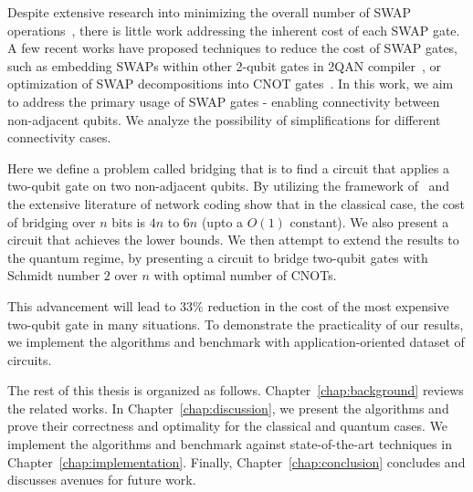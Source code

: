 Despite extensive research into minimizing the overall number of SWAP operations~\cite{childs, TODO}, there is little work addressing the inherent cost of each SWAP gate. A few recent works have proposed techniques to reduce the cost of SWAP gates, such as embedding SWAPs within other 2-qubit gates in 2QAN compiler~\cite{lao2021}, or optimization of SWAP decompositions into CNOT gates~\cite{kissinger2019,nash2020}. In this work, we aim to address the primary usage of SWAP gates - enabling connectivity between non-adjacent qubits. We analyze the possibility of simplifications for different connectivity cases.

Here we define a problem called bridging that is to find a circuit that applies a two-qubit gate on two non-adjacent qubits. By utilizing the framework of~\cite{kissinger2019} and the extensive literature of network coding \cite{TODO} show that in the classical case, the cost of bridging over $n$ bits is $4n$ to $6n$ (upto a $O(1)$ constant). We also present a circuit that achieves the lower bounds. We then attempt to extend the results to the quantum regime, by presenting a circuit to bridge two-qubit gates with Schmidt number $2$ over $n$ with optimal number of CNOTs.

This advancement will lead to $33\%$ reduction in the cost of the most expensive two-qubit gate in many situations. To demonstrate the practicality of our results, we implement the algorithms and benchmark with application-oriented dataset of circuits.

The rest of this thesis is organized as follows. Chapter~\ref{chap:background} reviews the related works. In Chapter~\ref{chap:discussion}, we present the algorithms and prove their correctness and optimality for the classical and quantum cases. We implement the algorithms and benchmark against state-of-the-art techniques in Chapter~\ref{chap:implementation}. Finally, Chapter~\ref{chap:conclusion} concludes and discusses avenues for future work.
